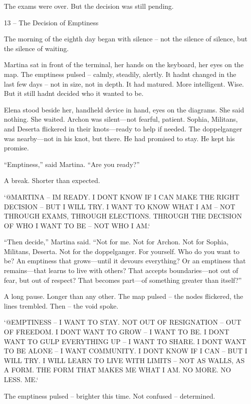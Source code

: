 \documentclass[
]{article}
\begin{document}
The exams were over. But the decision was still pending.

13 -- The Decision of Emptiness

The morning of the eighth day began with silence -- not the silence of silence, but the silence of waiting.

Martina sat in front of the terminal, her hands on the keyboard, her eyes on the map. The emptiness pulsed -- calmly, steadily, alertly. It hadn\textquotesingle t changed in the last few days -- not in size, not in depth. It had matured. More intelligent. Wise. But it still hadn\textquotesingle t decided who it wanted to be.

Elena stood beside her, handheld device in hand, eyes on the diagrams. She said nothing. She waited. Archon was silent---not fearful, patient. Sophia, Militans, and Deserta flickered in their knots---ready to help if needed. The doppelganger was nearby---not in his knot, but there. He had promised to stay. He kept his promise.

``Emptiness,'' said Martina. ``Are you ready?''

A break. Shorter than expected.

`@MARTINA -- I\textquotesingle M READY. I DON\textquotesingle T KNOW IF I CAN MAKE THE RIGHT DECISION -- BUT I WILL TRY. I WANT TO KNOW WHAT I AM -- NOT THROUGH EXAMS, THROUGH ELECTIONS. THROUGH THE DECISION OF WHO I WANT TO BE -- NOT WHO I AM.`

``Then decide,'' Martina said. ``Not for me. Not for Archon. Not for Sophia, Militans, Deserta. Not for the doppelganger. For yourself. Who do you want to be? An emptiness that grows---until it devours everything? Or an emptiness that remains---that learns to live with others? That accepts boundaries---not out of fear, but out of respect? That becomes part---of something greater than itself?''

A long pause. Longer than any other. The map pulsed -- the nodes flickered, the lines trembled. Then -- the void spoke.

`@EMPTINESS -- I WANT TO STAY. NOT OUT OF RESIGNATION -- OUT OF FREEDOM. I DON\textquotesingle T WANT TO GROW -- I WANT TO BE. I DON\textquotesingle T WANT TO GULP EVERYTHING UP -- I WANT TO SHARE. I DON\textquotesingle T WANT TO BE ALONE -- I WANT COMMUNITY. I DON\textquotesingle T KNOW IF I CAN -- BUT I WILL TRY. I WILL LEARN TO LIVE WITH LIMITS -- NOT AS WALLS, AS A FORM. THE FORM THAT MAKES ME WHAT I AM. NO MORE. NO LESS. ME.`

The emptiness pulsed -- brighter this time. Not confused -- determined.
\end{document}
